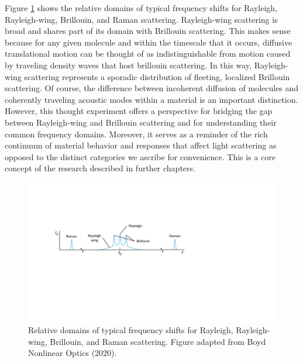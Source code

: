 Figure \ref{fig:Introduction:scattering-domains} shows the relative domains of typical frequency shifts for Rayleigh, Rayleigh-wing, Brillouin, and Raman scattering. Rayleigh-wing scattering is broad and shares part of its domain with Brillouin scattering. This makes sense because for any given molecule and within the timescale that it occurs, diffusive translational motion can be thought of as indistinguishable from motion caused by traveling density waves that host brillouin scattering. In this way, Rayleigh-wing scattering represents a sporadic distribution of fleeting, localized Brillouin scattering. Of course, the difference between incoherent diffusion of molecules and coherently traveling acoustic modes within a material is an important distinction. However, this thought experiment offers a perspective for bridging the gap between Rayleigh-wing and Brillouin scattering and for understanding their common frequency domains. Moreover, it serves as a reminder of the rich continuum of material behavior and responses that affect light scattering as opposed to the distinct categories we ascribe for convenience. This is a core concept of the research described in further chapters.%


\begin{figure}[t] %
\centering
\includegraphics[width=\textwidth]{figs/1-Intro/frequencyShifts.pdf}
\caption[Relative domains of typical frequency shifts for Rayleigh, Rayleigh-wing, Brillouin, and Raman scattering.]{Relative domains of typical frequency shifts for Rayleigh, Rayleigh-wing, Brillouin, and Raman scattering. Figure adapted from Boyd Nonlinear Optics (2020). \cite{boyd2020nonlinear}}
\label{fig:Introduction:scattering-domains}
\end{figure}

